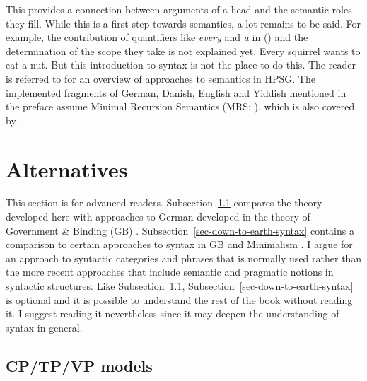 This provides a connection between arguments of a head and the semantic roles they fill. While this
is a first step towards semantics, a lot remains to be said. For example, the contribution of
quantifiers like \emph{every} and \emph{a} in () and the determination of the scope they take is not explained yet. 
\ea
Every squirrel wants to eat a nut.
\z
But this introduction to syntax is not the place to do this. The reader is referred to
 for an overview of approaches to semantics in HPSG. The implemented fragments of
German, Danish, English and Yiddish mentioned in the preface assume Minimal Recursion Semantics (MRS; \citealt{CFPS2005a}), which is
also covered by \citet[Section~6.1]{KoenigRichter2021a}.


\section{Alternatives}

This section is for advanced readers. Subsection~\ref{sec-cp-tp-vp} compares the theory developed here with approaches to
German developed in the theory of Government \& Binding (GB)
\citep{Chomsky81a,Chomsky86b}. Subsection~\ref{sec-down-to-earth-syntax} contains a comparison to
certain approaches to syntax in GB and Minimalism \citep{Chomsky95a-u}. I argue for an approach to
syntactic categories and phrases that is normally used rather than the more recent approaches that
include semantic and pragmatic notions in syntactic structures. Like
Subsection~\ref{sec-cp-tp-vp}, Subsection~\ref{sec-down-to-earth-syntax} is optional and it is
possible to understand the rest of the book without reading it. I suggest reading it nevertheless
since it may deepen the understanding of syntax in general.



\subsection{CP/TP/VP models}
\label{sec-cp-tp-vp}\label{sec-cp-tp-vp-scrambling}
\label{sec-discussion-scope}

